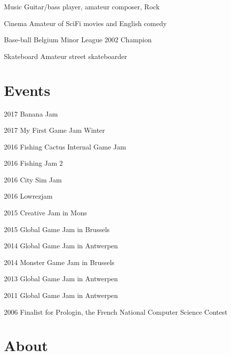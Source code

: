 \documentclass[11pt,letterpaper]{report}
\begin{document}
    \begin{tablist}

        \item[Music]        \tab{}Guitar/bass player, amateur composer, Rock
        \item[Cinema]        \tab{}Amateur of SciFi movies and English comedy
        \item[Base-ball]    \tab{}Belgium Minor League 2002 Champion
        \item[Skateboard]   \tab{}Amateur street skateboarder

    \end{tablist}

    \section*{Events}

    \begin{tablist}

        \item[2017]        \tab{}Banana Jam
        \item[2017]        \tab{}My First Game Jam Winter
        \item[2016]        \tab{}Fishing Cactus Internal Game Jam
        \item[2016]        \tab{}Fishing Jam 2
        \item[2016]        \tab{}City Sim Jam
        \item[2016]        \tab{}Lowrezjam
        \item[2015]        \tab{}Creative Jam in Mons
        \item[2015]        \tab{}Global Game Jam in Brussels
        \item[2014]        \tab{}Global Game Jam in Antwerpen
        \item[2014]        \tab{}Monster Game Jam in Brussels
        \item[2013]        \tab{}Global Game Jam in Antwerpen
        \item[2011]        \tab{}Global Game Jam in Antwerpen
        \item[2006]        \tab{}Finalist for Prologin, the French National Computer Science Contest

    \end{tablist}

    \section*{About}
\end{document}
